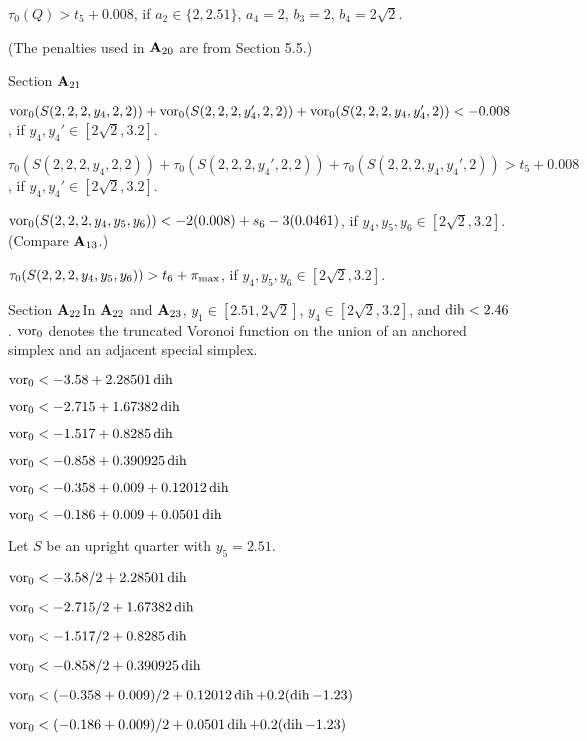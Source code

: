 $\tau_0(Q) > t_5 +0.008$,
	if $a_2\in\{2,2.51\}$,
	$a_4=2$, 
	$b_3=2$,
	$b_4=2\sqrt2$. 

(The penalties used in ${\bold A}_{20}$ are from Section 5.5.)


\subhead Section ${\bold A}_{21}$\endsubhead

$\operatorname{vor}_0(S(2,2,2,y_4,2,2))+\operatorname{vor}_0(S(2,2,2,y_4',2,2))
	+\operatorname{vor}_0(S(2,2,2,y_4,y_4',2))
		< -0.008$, if $y_4,y_4'\in[2\sqrt2,3.2]$.

$\tau_0(S(2,2,2,y_4,2,2))+\tau_0(S(2,2,2,y_4',2,2))
	+\tau_0(S(2,2,2,y_4,y_4',2))
		> t_5+ 0.008$, if $y_4,y_4'\in[2\sqrt2,3.2]$.

$\operatorname{vor}_0(S(2,2,2,y_4,y_5,y_6)) < -2(0.008) + s_6-3(0.0461)$, if
	$y_4,y_5,y_6\in[2\sqrt2,3.2]$. (Compare ${\bold A}_{13}$.)

$\tau_0(S(2,2,2,y_4,y_5,y_6)) > t_6 + \pi_{\max}$, if
	$y_4,y_5,y_6\in[2\sqrt2,3.2]$.



\subhead Section ${\bold A}_{22}$\endsubhead  In ${\bold A}_{22}$ and ${\bold A}_{23}$,
$y_1\in [2.51,2\sqrt2]$, $y_4\in[2\sqrt2,3.2]$, and
$\operatorname{dih}<2.46$. 
$\operatorname{vor}_0$ denotes the truncated Voronoi function
on the union of an anchored simplex and an adjacent special simplex.


  $\operatorname{vor}_0 < -3.58 + 2.28501 \operatorname{dih}$

 $\operatorname{vor}_0 < -2.715 + 1.67382 \operatorname{dih}$

 $\operatorname{vor}_0 < -1.517 + 0.8285 \operatorname{dih}$

 $\operatorname{vor}_0 < -0.858 + 0.390925 \operatorname{dih}$

 $\operatorname{vor}_0 < -0.358+0.009 + 0.12012 \operatorname{dih}$

 $\operatorname{vor}_0 < -0.186+0.009 + 0.0501 \operatorname{dih}$

Let $S$ be an upright quarter with $y_5=2.51$.

  $\operatorname{vor}_0 < -3.58/2 + 2.28501 \operatorname{dih}$

 $\operatorname{vor}_0 < -2.715/2 + 1.67382 \operatorname{dih}$

 $\operatorname{vor}_0 < -1.517/2 + 0.8285 \operatorname{dih}$

 $\operatorname{vor}_0 < -0.858/2 + 0.390925 \operatorname{dih}$

 $\operatorname{vor}_0 < (-0.358+0.009)/2 + 0.12012 \operatorname{dih}+0.2(\operatorname{dih}-1.23)$

 $\operatorname{vor}_0 < (-0.186+0.009)/2 + 0.0501 \operatorname{dih}+0.2(\operatorname{dih}-1.23)$


